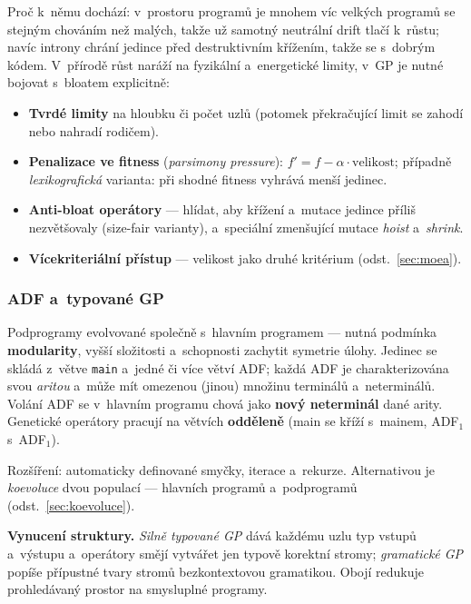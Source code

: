 \documentclass[11pt,a4paper]{article}
\theoremstyle{definition}
\begin{document}
Proč k~němu dochází: v~prostoru programů je mnohem víc velkých programů se stejným
chováním než malých, takže už samotný neutrální drift tlačí k~růstu; navíc introny chrání
jedince před destruktivním křížením, takže se  s~dobrým kódem.
V~přírodě růst naráží na fyzikální a~energetické limity, v~GP je nutné bojovat s~bloatem
explicitně:
\begin{itemize}
\item \textbf{Tvrdé limity} na hloubku či počet uzlů (potomek překračující limit se zahodí
  nebo nahradí rodičem).
\item \textbf{Penalizace ve fitness} (\emph{parsimony pressure}):
  $f' = f - \alpha \cdot \text{velikost}$; případně \emph{lexikografická} varianta:
  při shodné fitness vyhrává menší jedinec.
\item \textbf{Anti-bloat operátory} --- hlídat, aby křížení a~mutace jedince příliš
  nezvětšovaly (size-fair varianty), a~speciální zmenšující mutace \emph{hoist}
  a~\emph{shrink}.
\item \textbf{Vícekriteriální přístup} --- velikost jako druhé kritérium
  (odst.~\ref{sec:moea}).
\end{itemize}

\subsubsection{ADF a~typované GP}

\begin{defbox}
Podprogramy evolvované společně s~hlavním programem --- nutná podmínka
\textbf{modularity}, vyšší složitosti a~schopnosti zachytit symetrie úlohy.
Jedinec se skládá z~větve \texttt{main} a~jedné či více větví ADF; každá ADF je
charakterizována svou \emph{aritou} a~může mít omezenou (jinou) množinu terminálů
a~neterminálů. Volání ADF se v~hlavním programu chová jako \textbf{nový neterminál}
dané arity. Genetické operátory pracují na větvích \textbf{odděleně}
(main se kříží s~mainem, ADF$_1$ s~ADF$_1$).

Rozšíření: automaticky definované smyčky, iterace a~rekurze. Alternativou je
\emph{koevoluce} dvou populací --- hlavních programů a~podprogramů
(odst.~\ref{sec:koevoluce}).
\end{defbox}

\textbf{Vynucení struktury.} \emph{Silně typované GP} dává každému uzlu typ vstupů
a~výstupu a~operátory smějí vytvářet jen typově korektní stromy; \emph{gramatické GP}
popíše přípustné tvary stromů bezkontextovou gramatikou. Obojí redukuje prohledávaný
prostor na smysluplné programy.
\end{document}
